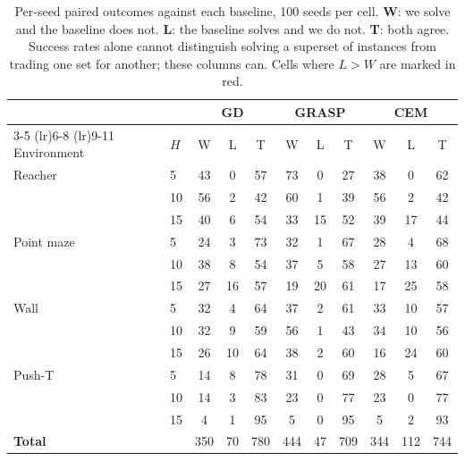 \newcommand{\bad}[1]{\textcolor{red!70!black}{#1}}
\begin{table}[h]
  \caption{Per-seed paired outcomes against each baseline, 100 seeds per cell.
  \textbf{W}: we solve and the baseline does not. \textbf{L}: the baseline
  solves and we do not. \textbf{T}: both agree. Success rates alone cannot
  distinguish solving a superset of instances from trading one set for another;
  these columns can. Cells where $L>W$ are marked in red.}
  \label{tab:paired}
  \centering
  \setlength{\tabcolsep}{5pt}
  \begin{tabular}{ll ccc ccc ccc}
    \toprule
    & & \multicolumn{3}{c}{GD} & \multicolumn{3}{c}{GRASP} & \multicolumn{3}{c}{CEM} \\
    \cmidrule(lr){3-5} \cmidrule(lr){6-8} \cmidrule(lr){9-11}
    Environment & $H$ & W & L & T & W & L & T & W & L & T \\
    \midrule
    Reacher     & 5  & 43 & 0 & 57 & 73 & 0 & 27 & 38 & 0 & 62 \\
                & 10 & 56 & 2 & 42 & 60 & 1 & 39 & 56 & 2 & 42 \\
                & 15 & 40 & 6 & 54 & 33 & 15 & 52 & 39 & 17 & 44 \\
    \midrule
    Point maze  & 5  & 24 & 3 & 73 & 32 & 1 & 67 & 28 & 4 & 68 \\
                & 10 & 38 & 8 & 54 & 37 & 5 & 58 & 27 & 13 & 60 \\
                & 15 & 27 & 16 & 57 & \bad{19} & 20 & 61 & \bad{17} & 25 & 58 \\
    \midrule
    Wall        & 5  & 32 & 4 & 64 & 37 & 2 & 61 & 33 & 10 & 57 \\
                & 10 & 32 & 9 & 59 & 56 & 1 & 43 & 34 & 10 & 56 \\
                & 15 & 26 & 10 & 64 & 38 & 2 & 60 & \bad{16} & 24 & 60 \\
    \midrule
    Push-T      & 5  & 14 & 8 & 78 & 31 & 0 & 69 & 28 & 5 & 67 \\
                & 10 & 14 & 3 & 83 & 23 & 0 & 77 & 23 & 0 & 77 \\
                & 15 & 4 & 1 & 95 & 5 & 0 & 95 & 5 & 2 & 93 \\
    \midrule
    \textbf{Total} & & 350 & 70 & 780 & 444 & 47 & 709 & 344 & 112 & 744 \\
    \bottomrule
  \end{tabular}
\end{table}
